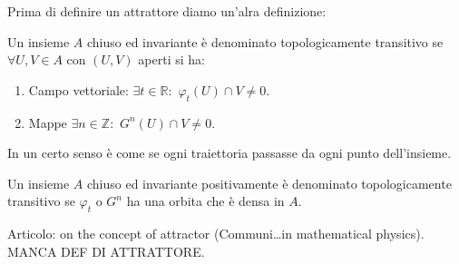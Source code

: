 \noindent
Prima di definire un attrattore diamo un'alra definizione:
\begin{defn}
    Un insieme $A$ chiuso ed invariante è denominato topologicamente transitivo se $\forall U, V \in A$ con $(U, V)$ aperti si ha:
    \begin{enumerate}
	\item Campo vettoriale: $\exists t \in \mathbb{R}: $ $\varphi_t(U) \cap V \neq 0$.
	\item Mappe $\exists n \in \mathbb{Z}:$ $G^n(U) \cap V \neq 0$.
    \end{enumerate}
\end{defn}
\noindent
In un certo senso è come se ogni traiettoria passasse da ogni punto dell'insieme.
\begin{defn}
    Un insieme $A$ chiuso ed invariante positivamente è denominato topologicamente transitivo se  $\varphi_t$ o $G^n$ ha una orbita che è densa in $A$.
\end{defn}
\noindent
Articolo: on the concept of attractor (Communi\ldots in mathematical physics).
MANCA DEF DI ATTRATTORE.
